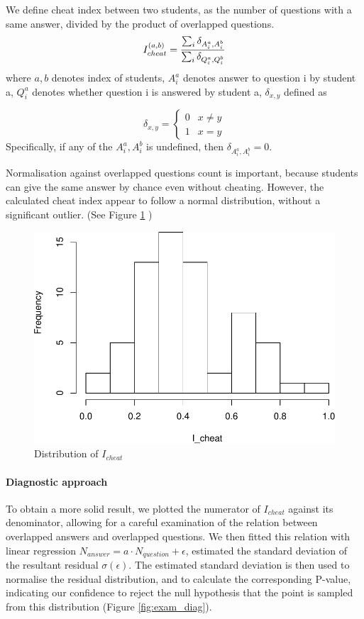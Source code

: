 \documentclass[a4paperpaper,]{article}
\let\oldparagraph\paragraph
\renewcommand{\paragraph}[1]{\oldparagraph{#1}\mbox{}}
\begin{document}
We define cheat index between two students, as the number of questions
with a same answer, divided by the product of overlapped questions. \[ 
I_{cheat}^{(a,b)} = 
  {\sum_{i}{\delta_{A_i^a,A_i^b} }
  \over
  {\sum_{i}{\delta_{Q_i^a,Q_i^b} } } 
  }
\] where \(a,b\) denotes index of students, \(A_i^a\) denotes answer to
question i by student a, \(Q_i^a\) denotes whether question i is
answered by student a, \(\delta_{x,y}\) defined as

\[ 
\delta_{x,y} = \left\{
  \begin{array}{ll}
            0 & x \neq y \\
            1 & x = y
  \end{array}
\right.
\] Specifically, if any of the \(A_i^a,A_i^b\) is undefined, then
\(\delta_{A_i^a,A_i^b} = 0\).

Normalisation against overlapped questions count is important, because
students can give the same answer by chance even without cheating.
However, the calculated cheat index appear to follow a normal
distribution, without a significant outlier. (See Figure
\ref{fig:exam_naive} )

\begin{figure}
\centering
\includegraphics{index_files/figure-latex/exam_naive-1.pdf}
\caption{\label{fig:exam_naive} Distribution of \(I_{cheat}\)}
\end{figure}

\paragraph{Diagnostic approach}\label{diagnostic-approach}

To obtain a more solid result, we plotted the numerator of \(I_{cheat}\)
against its denominator, allowing for a careful examination of the
relation between overlapped answers and overlapped questions. We then
fitted this relation with linear regression
\(N_{answer} = a\cdot N_{question} + \epsilon\), estimated the standard
deviation of the resultant residual \(\sigma(\epsilon)\). The estimated
standard deviation is then used to normalise the residual distribution,
and to calculate the corresponding P-value, indicating our confidence to
reject the null hypothesis that the point is sampled from this
distribution (Figure \ref{fig:exam_diag}).
\end{document}
